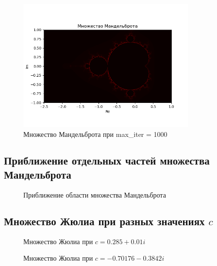 \documentclass{article}
\begin{document}
	\begin{figure}[H]
		\centering
		\includegraphics[width=0.8\textwidth]{images/mandelbrot_iter1000.png}
		\caption{Множество Мандельброта при max\_iter = 1000}
		\label{fig:mandelbrot1000}
	\end{figure}
	
	\subsection{Приближение отдельных частей множества Мандельброта}
	
	\begin{figure}[H]
		\centering
		\caption{Приближение области множества Мандельброта}
		\label{fig:mandelbrot_zoom1}
	\end{figure}
	
	\subsection{Множество Жюлиа при разных значениях $c$}
	\begin{figure}[H]
		\centering
		\caption{Множество Жюлиа при $c = 0.285 + 0.01i$}
		\label{fig:julia_c1}
	\end{figure}
	
	\begin{figure}[H]
		\centering
		\caption{Множество Жюлиа при $c = -0.70176 - 0.3842i$}
		\label{fig:julia_c2}
	\end{figure}
	
	\newpage
	
\end{document}
